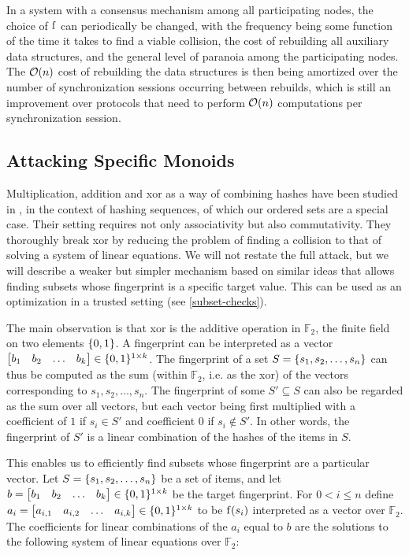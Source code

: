 In a system with a consensus mechanism among all participating nodes, the choice of $\operatorname{f}$ can periodically be changed, with the frequency being some function of the time it takes to find a viable collision, the cost of rebuilding all auxiliary data structures, and the general level of paranoia among the participating nodes. The $\mathcal{O}(n)$ cost of rebuilding the data structures is then being amortized over the number of synchronization sessions occurring between rebuilds, which is still an improvement over protocols that need to perform $\mathcal{O}(n)$ computations per synchronization session.

\subsection{Attacking Specific Monoids}

Multiplication, addition and xor as a way of combining hashes have been studied in \cite{bellare1997new}, in the context of hashing sequences, of which our ordered sets are a special case. Their setting requires not only associativity but also commutativity. They thoroughly break xor by reducing the problem of finding a collision to that of solving a system of linear equations. We will not restate the full attack, but we will describe a weaker but simpler mechanism based on similar ideas that allows finding subsets whose fingerprint is a specific target value. This can be used as an optimization in a trusted setting (see \cref{subset-checks}).

The main observation is that xor is the additive operation in $\mathds{F}_2$, the finite field on two elements $\{0, 1\}$. A fingerprint can be interpreted as a vector $\begin{bmatrix}b_1 & b_2 & \ldots & b_k\end{bmatrix} \in \{0, 1\}^{1 \times k}$. The fingerprint of a set $S = \{s_1, s_2, \ldots, s_n\}$ can thus be computed as the sum (within $\mathds{F}_2$, i.e. as the xor) of the vectors corresponding to $s_1, s_2, \ldots, s_n$. The fingerprint of some $S' \subseteq S$ can also be regarded as the sum over all vectors, but each vector being first multiplied with a coefficient of $1$ if $s_i \in S'$ and coefficient $0$ if $s_i \notin S'$. In other words, the fingerprint of $S'$ is a linear combination of the hashes of the items in $S$. 

This enables us to efficiently find subsets whose fingerprint are a particular vector. Let $S = \{s_1, s_2, \ldots, s_n\}$ be a set of items, and let $b = \begin{bmatrix}b_1 & b_2 & \ldots & b_k\end{bmatrix} \in \{0, 1\}^{1 \times k}$ be the target fingerprint. For $0 < i \leq n$ define $a_i = \begin{bmatrix}a_{i, 1} & a_{i, 2} & \ldots & a_{i, k}\end{bmatrix} \in \{0, 1\}^{1 \times k}$ to be $\operatorname{f}(s_i)$ interpreted as a vector over $\mathds{F}_2$. The coefficients for linear combinations of the $a_i$ equal to $b$ are the solutions to the following system of linear equations over $\mathds{F}_2$:

